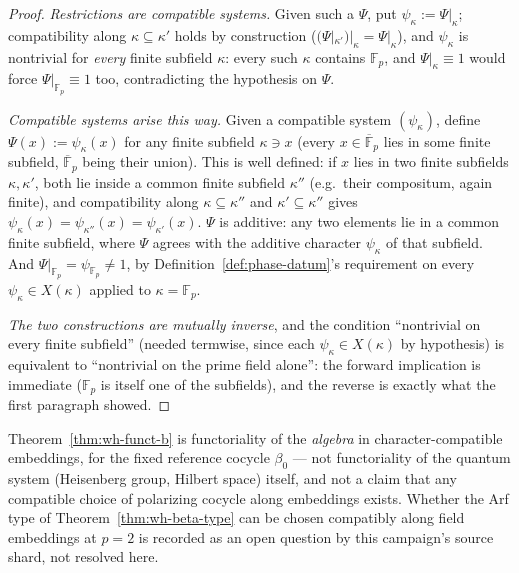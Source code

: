 \begin{proof}
\emph{Restrictions are compatible systems.} Given such a $\Psi$, put
$\psi_\kappa:=\Psi|_\kappa$; compatibility along $\kappa\subseteq\kappa'$
holds by construction ($(\Psi|_{\kappa'})|_\kappa=\Psi|_\kappa$), and
$\psi_\kappa$ is nontrivial for \emph{every} finite subfield $\kappa$: every
such $\kappa$ contains $\mathbb{F}_p$, and $\Psi|_\kappa\equiv 1$ would
force $\Psi|_{\mathbb{F}_p}\equiv 1$ too, contradicting the hypothesis on
$\Psi$.

\emph{Compatible systems arise this way.} Given a compatible system
$(\psi_\kappa)$, define $\Psi(x):=\psi_\kappa(x)$ for any finite subfield
$\kappa\ni x$ (every $x\in\overline{\mathbb{F}}_p$ lies in some finite
subfield, $\overline{\mathbb{F}}_p$ being their union). This is well
defined: if $x$ lies in two finite subfields $\kappa,\kappa'$, both lie
inside a common finite subfield $\kappa''$ (e.g.\ their compositum, again
finite), and compatibility along $\kappa\subseteq\kappa''$ and
$\kappa'\subseteq\kappa''$ gives $\psi_\kappa(x)=\psi_{\kappa''}(x)=\psi_{\kappa'}(x)$.
$\Psi$ is additive: any two elements lie in a common finite subfield, where
$\Psi$ agrees with the additive character $\psi_\kappa$ of that subfield.
And $\Psi|_{\mathbb{F}_p}=\psi_{\mathbb{F}_p}\neq 1$, by
Definition~\ref{def:phase-datum}'s requirement on every $\psi_\kappa\in X(\kappa)$
applied to $\kappa=\mathbb{F}_p$.

\emph{The two constructions are mutually inverse}, and the condition
``nontrivial on every finite subfield'' (needed termwise, since each
$\psi_\kappa\in X(\kappa)$ by hypothesis) is equivalent to ``nontrivial on
the prime field alone'': the forward implication is immediate ($\mathbb{F}_p$
is itself one of the subfields), and the reverse is exactly what the first
paragraph showed.
\end{proof}

\begin{remark}
Theorem~\ref{thm:wh-funct-b} is functoriality of the \emph{algebra} in
character-compatible embeddings, for the fixed reference cocycle
$\beta_0$ — not functoriality of the quantum system (Heisenberg group,
Hilbert space) itself, and not a claim that any compatible choice of
polarizing cocycle along embeddings exists. Whether the Arf type of
Theorem~\ref{thm:wh-beta-type} can be chosen compatibly along field
embeddings at $p=2$ is recorded as an open question by this campaign's
source shard, not resolved here.
\end{remark}
